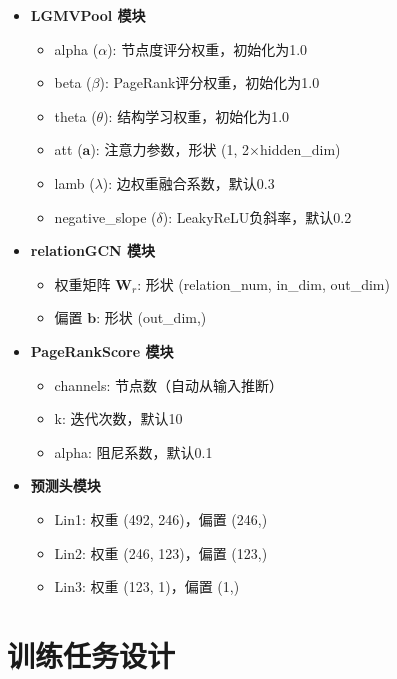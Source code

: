 \begin{itemize}
    \item \textbf{LGMVPool 模块}
    \begin{itemize}
        \item alpha ($\alpha$): 节点度评分权重，初始化为1.0
        \item beta ($\beta$): PageRank评分权重，初始化为1.0
        \item theta ($\theta$): 结构学习权重，初始化为1.0
        \item att ($\mathbf{a}$): 注意力参数，形状 (1, 2$\times$hidden\_dim)
        \item lamb ($\lambda$): 边权重融合系数，默认0.3
        \item negative\_slope ($\delta$): LeakyReLU负斜率，默认0.2
    \end{itemize}
    
    \item \textbf{relationGCN 模块}
    \begin{itemize}
        \item 权重矩阵 $\mathbf{W}_r$: 形状 (relation\_num, in\_dim, out\_dim)
        \item 偏置 $\mathbf{b}$: 形状 (out\_dim,)
    \end{itemize}
    
    \item \textbf{PageRankScore 模块}
    \begin{itemize}
        \item channels: 节点数（自动从输入推断）
        \item k: 迭代次数，默认10
        \item alpha: 阻尼系数，默认0.1
    \end{itemize}
    
    \item \textbf{预测头模块}
    \begin{itemize}
        \item Lin1: 权重 (492, 246)，偏置 (246,)
        \item Lin2: 权重 (246, 123)，偏置 (123,)
        \item Lin3: 权重 (123, 1)，偏置 (1,)
    \end{itemize}
\end{itemize}

\newpage

\section{训练任务设计}

